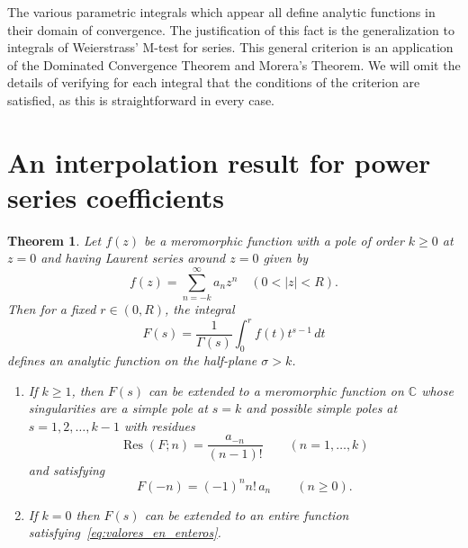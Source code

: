 \documentclass[11pt,a4paper]{amsart}
\newcommand{\C}{\mathbb{C}}
\newcommand{\Res}{\operatorname{Res}}
\theoremstyle{plain}
\newtheorem{theorem}{Theorem}
\theoremstyle{plain}
\theoremstyle{plain}
\theoremstyle{definition}
\theoremstyle{remark}
\begin{document}
The various parametric integrals which appear all define analytic functions in their domain of convergence. The justification of this fact is the generalization to integrals of Weierstrass' M-test for series. This general criterion is an application of the Dominated Convergence Theorem and Morera's Theorem. We will omit the details of verifying for each integral that the conditions of the criterion are satisfied, as this is straightforward in every case.


\section{An interpolation result for power series coefficients}
\label{sec:interpolation}

\begin{theorem}
\label{th:interpolation}
Let $f(z)$ be a meromorphic function with a pole of order $k \geq 0$ at $z = 0$ and having Laurent series around $z=0$ given by
\[
  f(z) = \sum_{n=-k}^{\infty} a_{n} z^{n}
  \quad (0 < |z| < R).
\]
Then for a fixed $r \in (0,R)$, the integral
\[
  F(s) = \frac{1}{\Gamma(s)} \int_{0}^r f(t) t^{s-1}\,dt
\]
defines an analytic function on the half-plane $\sigma > k$. 
\begin{enumerate}[label=\emph{(\alph*)}]
\item If $k \geq 1$, then $F(s)$ can be extended to a meromorphic function on $\C$ whose singularities are a simple pole at $s=k$ and possible simple poles
at $s = 1,2,\dots, k-1$ with residues 
\begin{equation}
  \label{eq:valores_en_residuos}
  \Res(F;n) = \frac{a_{-n}}{(n-1)!} \qquad (n = 1,\dots,k)
\end{equation}
and satisfying
\begin{equation}
  \label{eq:valores_en_enteros}
  F(-n) = (-1)^{n} n!\, a_{n} \qquad (n \ge 0).
\end{equation}
\item If $k = 0$ then $F(s)$ can be extended to an entire function satisfying~\eqref{eq:valores_en_enteros}.
\end{enumerate}
\end{theorem}
\end{document}
